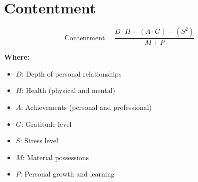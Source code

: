 \chapter{Contentment}

\begin{equation}
\text{Contentment} = \frac{D \cdot H + (A \cdot G) - (S^2)}{M + P}
\end{equation}

\textbf{Where:}

\begin{itemize}
    \item $D$: Depth of personal relationships
    \item $H$: Health (physical and mental)
    \item $A$: Achievements (personal and professional)
    \item $G$: Gratitude level
    \item $S$: Stress level
    \item $M$: Material possessions
    \item $P$: Personal growth and learning
\end{itemize}
